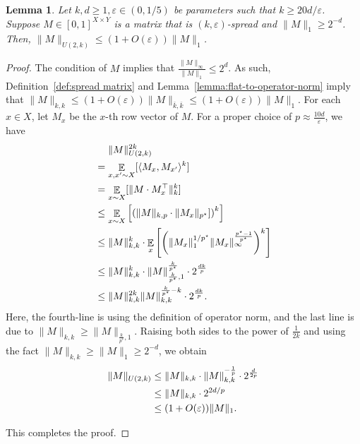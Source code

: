 \documentclass[11pt]{article}
\newtheorem{lemma}[theorem]{Lemma}
\DeclareMathOperator*{\E}{\mathbb{E}}
\newcommand{\1}{ \mathbbm{1}}
\newcommand{\eps}{\varepsilon}
\begin{document}
\begin{lemma}\label{lemma: grid upper bound for spread matrix}
    Let $k,d\ge 1, \eps\in (0,1/5)$ be parameters such that $k\ge 20 d/\eps$. Suppose $M\in [0,1]^{X\times Y}$ is a matrix that is $(k,\eps)$-spread and $\|M\|_1 \ge 2^{-d}$. Then, $\| M \|_{U(2,k)} \le (1+O(\eps)) \| M \|_1$.
\end{lemma}

\begin{proof}
The condition of $M$ implies that $\frac{\|M\|_\infty}{\|M\|_1}\le 2^d$. As such, Definition~\ref{def:spread matrix} and Lemma~\ref{lemma:flat-to-operator-norm} imply that $\|M\|_{k,k} \le (1+O(\eps)) \|M\|_{\overline{k},\overline{k}} \le (1+O(\eps)) \|M\|_{1}$. For each $x\in X$, let $M_x$ be the $x$-th row vector of $M$. For a proper choice of $p\approx \frac{10d}{\eps}$, we have
\begin{align}
&~~~~ \| M \|_{U(2,k)}^{2k}  \\
&= \E_{x,x'\sim X}[ \langle M_x,M_{x'} \rangle^{k}] \notag \\
&= \E_{x\sim X} [ \| M \cdot M_x^\top  \|_k^k ] \notag \\
&\le \E_{x\sim X} \left[ \left(  \| M \|_{k, p} \cdot \|M_x\|_{p^\star}]  \right)^{k} \right]  \notag \\
&\le \| M \|_{k,k}^k \cdot \E_{x} \left[ \left( \| M_x \|_1^{1/p^{\star}} \| M_x \|_{\infty}^{\frac{p^\star -1}{p^\star}} \right)^{k}  \right] \notag \\
&\le\| M \|_{k,k}^k \cdot \| M \|_{\frac{k}{p^\star}, 1}^{\frac{k}{p^\star}} \cdot  2^{\frac{dk}{p}}  \notag \\
&\le \| M \|_{k,k}^{2k} \|M \|_{k,k}^{\frac{k}{p^\star} - k} \cdot 2^{\frac{dk}{p}}. \notag
\end{align}
Here, the fourth-line is using the definition of operator norm, and the last line is due to $\|M\|_{k,k}\ge \|M\|_{\frac{k}{p^*},1}$. Raising both sides to the power of $\frac{1}{2k}$ and using the fact $\|M\|_{k,k}\ge \|M\|_{1}\ge 2^{-d}$, we obtain
\begin{align}
    \| M \|_{U(2,k)} &\le \|M\|_{k,k}\cdot \|M\|_{k,k}^{-\frac{1}{p}}  \cdot 2^{\frac{d}{2p}} \notag \\
    &\le \|M\|_{k,k}\cdot 2^{2d/p} \notag\\
    &\le (1+O(\eps)) \|M\|_1.
\end{align}

This completes the proof.
\end{proof}
\end{document}
